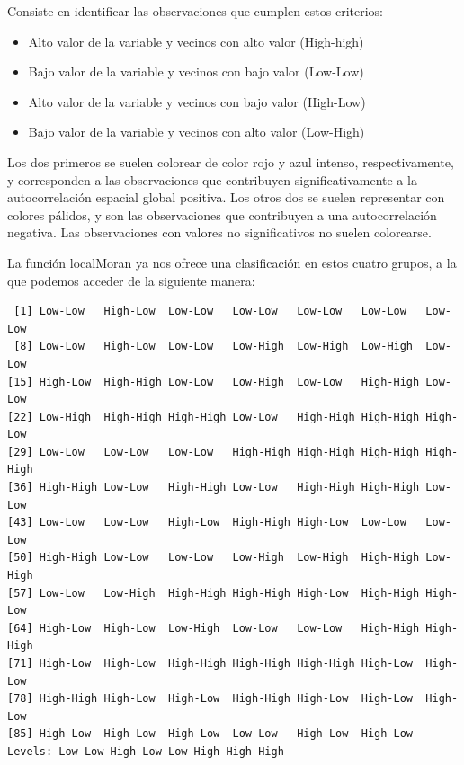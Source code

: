 \documentclass[
  letterpaper,
  DIV=11,
  numbers=noendperiod]{scrreprt}
\newenvironment{Shaded}{\begin{snugshade}}{\end{snugshade}}
\newcommand{\NormalTok}[1]{\textcolor[rgb]{0.00,0.23,0.31}{#1}}
\newcommand{\SpecialCharTok}[1]{\textcolor[rgb]{0.37,0.37,0.37}{#1}}
\begin{document}
Consiste en identificar las observaciones que cumplen estos criterios:

\begin{itemize}
\item
  Alto valor de la variable y vecinos con alto valor (High-high)
\item
  Bajo valor de la variable y vecinos con bajo valor (Low-Low)
\item
  Alto valor de la variable y vecinos con bajo valor (High-Low)
\item
  Bajo valor de la variable y vecinos con alto valor (Low-High)
\end{itemize}

Los dos primeros se suelen colorear de color rojo y azul intenso,
respectivamente, y corresponden a las observaciones que contribuyen
significativamente a la autocorrelación espacial global positiva. Los
otros dos se suelen representar con colores pálidos, y son las
observaciones que contribuyen a una autocorrelación negativa. Las
observaciones con valores no significativos no suelen colorearse.

La función localMoran ya nos ofrece una clasificación en estos cuatro
grupos, a la que podemos acceder de la siguiente manera:

\begin{Shaded}
\end{Shaded}

\begin{verbatim}
 [1] Low-Low   High-Low  Low-Low   Low-Low   Low-Low   Low-Low   Low-Low  
 [8] Low-Low   High-Low  Low-Low   Low-High  Low-High  Low-High  Low-Low  
[15] High-Low  High-High Low-Low   Low-High  Low-Low   High-High Low-Low  
[22] Low-High  High-High High-High Low-Low   High-High High-High High-Low 
[29] Low-Low   Low-Low   Low-Low   High-High High-High High-High High-High
[36] High-High Low-Low   High-High Low-Low   High-High High-High Low-Low  
[43] Low-Low   Low-Low   High-Low  High-High High-Low  Low-Low   Low-Low  
[50] High-High Low-Low   Low-Low   Low-High  Low-High  High-High Low-High 
[57] Low-Low   Low-High  High-High High-High High-Low  High-High High-Low 
[64] High-Low  High-Low  Low-High  Low-Low   Low-Low   High-High High-High
[71] High-Low  High-Low  High-High High-High High-High High-Low  High-Low 
[78] High-High High-Low  High-Low  High-High High-Low  High-Low  High-Low 
[85] High-Low  High-Low  High-Low  Low-Low   High-Low  High-Low 
Levels: Low-Low High-Low Low-High High-High
\end{verbatim}
\end{document}
